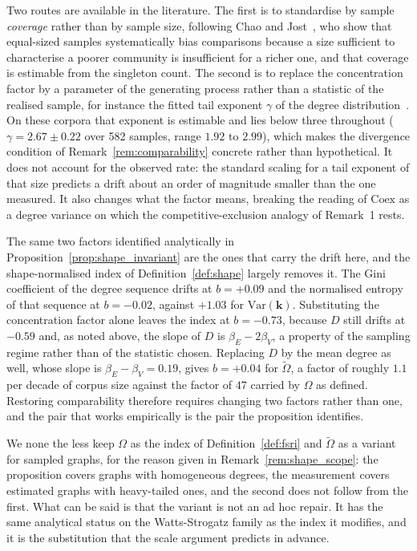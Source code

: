 \documentclass[11pt,a4paper]{article}
\begin{document}
Two routes are available in the literature. The first is to standardise by
sample \emph{coverage} rather than by sample size, following Chao and
Jost~\cite{chao2012coverage}, who show that equal-sized samples
systematically bias comparisons because a size sufficient to characterise a
poorer community is insufficient for a richer one, and that coverage is
estimable from the singleton count. The second is to replace the
concentration factor by a parameter of the generating process rather than a
statistic of the realised sample, for instance the fitted tail exponent
$\gamma$ of the degree distribution~\cite{clauset2009}. On these corpora
that exponent is estimable and lies below three throughout
($\gamma = 2.67 \pm 0.22$ over 582 samples, range $1.92$ to $2.99$), which
makes the divergence condition of Remark~\ref{rem:comparability} concrete
rather than hypothetical. It does not account for the observed rate: the
standard scaling for a tail exponent of that size predicts a drift about an
order of magnitude smaller than the one measured. It also changes what the
factor means, breaking the reading of $\mathrm{Coex}$ as a degree variance
on which the competitive-exclusion analogy of Remark~1 rests.

The same two factors identified analytically in
Proposition~\ref{prop:shape_invariant} are the ones that carry the drift
here, and the shape-normalised index of Definition~\ref{def:shape} largely
removes it. The Gini coefficient of the degree sequence drifts at
$b = +0.09$ and the normalised entropy of that sequence at $b = -0.02$,
against $+1.03$ for $\mathrm{Var}(\mathbf{k})$. Substituting the
concentration factor alone leaves the index at $b = -0.73$, because $D$
still drifts at $-0.59$ and, as noted above, the slope of $D$ is
$\beta_E - 2\beta_V$, a property of the sampling regime rather than of the
statistic chosen. Replacing $D$ by the mean degree as well, whose slope is
$\beta_E - \beta_V = 0.19$, gives $b = +0.04$ for $\widetilde{\Omega}$, a
factor of roughly $1.1$ per decade of corpus size against the factor of
$47$ carried by $\Omega$ as defined. Restoring comparability therefore
requires changing two factors rather than one, and the pair that works
empirically is the pair the proposition identifies.

We none the less keep $\Omega$ as the index of Definition~\ref{def:fsri}
and $\widetilde{\Omega}$ as a variant for sampled graphs, for the reason
given in Remark~\ref{rem:shape_scope}: the proposition covers graphs with
homogeneous degrees, the measurement covers estimated graphs with
heavy-tailed ones, and the second does not follow from the first. What can
be said is that the variant is not an ad hoc repair. It has the same
analytical status on the Watts-Strogatz family as the index it modifies,
and it is the substitution that the scale argument predicts in advance.
\end{document}
